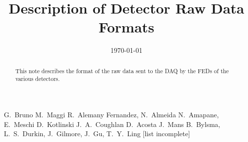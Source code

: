\documentclass[a4paper]{cmspaper}
\newcommand{\pdfbookmark}[3][1]{}
\begin{document}
\begin{titlepage}

  \date{\today}

  \title{Description of Detector Raw Data Formats}
  \begin{Authlist}
    G.~Bruno %
    M.~Maggi %
    R.~Alemany Fernandez, N.~Almeida %
    N.~Amapane, E.~Meschi
    D.~Kotlinski %
    J.~A.~Coughlan %
    D.~Acosta %
    J.~Mans %
    B.~Bylsma, L.~S.~Durkin, J.~Gilmore, J.~Gu, T.~Y.~Ling %
    [list incomplete]

  \end{Authlist}

  \begin{abstract}
    \pdfbookmark[1]{Abstract}{Abstract}
    This note describes the format of the raw data sent to the DAQ by
    the FEDs of the various detectors.
  \end{abstract} 
  
\end{titlepage}

\setcounter{page}{2}

\linenumbers %

 
 


\graphicspath{{../../../EcalRawData/doc/tex/}}
 \clearpage
 \clearpage



%
 

% 


\end{document}
